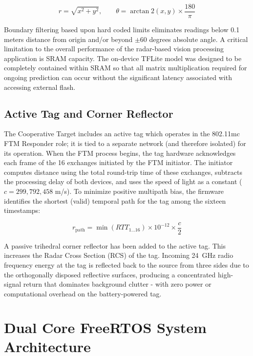 \begin{equation}
r = \sqrt{x^2 + y^2}, \qquad \theta = \arctan2(x, y) \times \frac{180}{\pi}
\label{eq:polar}
\end{equation}

Boundary filtering based upon hard coded limits eliminates readings below 0.1 meters distance from origin and/or beyond $\pm$60 degrees absolute angle. A critical limitation to the overall performance of the radar-based vision processing application is SRAM capacity. The on-device TFLite model was designed to be completely contained within SRAM so that all matrix multiplication required for ongoing prediction can occur without the significant latency associated with accessing external flash.

\subsection{Active Tag and Corner Reflector}
\label{sec:activetag}

The Cooperative Target includes an active tag which operates in the 802.11mc FTM Responder role; it is tied to a separate network (and therefore isolated) for its operation. When the FTM process begins, the tag hardware acknowledges each frame of the 16 exchanges initiated by the FTM initiator. The initiator computes distance using the total round-trip time of these exchanges, subtracts the processing delay of both devices, and uses the speed of light as a constant ($c = 299{,}792{,}458$ m/s). To minimize positive multipath bias, the firmware identifies the shortest (valid) temporal path for the tag among the sixteen timestamps:

\begin{equation}
r_{\text{path}} = \min(RTT_{1\ldots16}) \times 10^{-12} \times \frac{c}{2}
\label{eq:ftm_range}
\end{equation}

A passive trihedral corner reflector has been added to the active tag. This increases the Radar Cross Section (RCS) of the tag. Incoming 24~GHz radio frequency energy at the tag is reflected back to the source from three sides due to the orthogonally disposed reflective surfaces, producing a concentrated high-signal return that dominates background clutter - with zero power or computational overhead on the battery-powered tag.

\section{Dual Core FreeRTOS System Architecture}
\label{sec:freertos}

